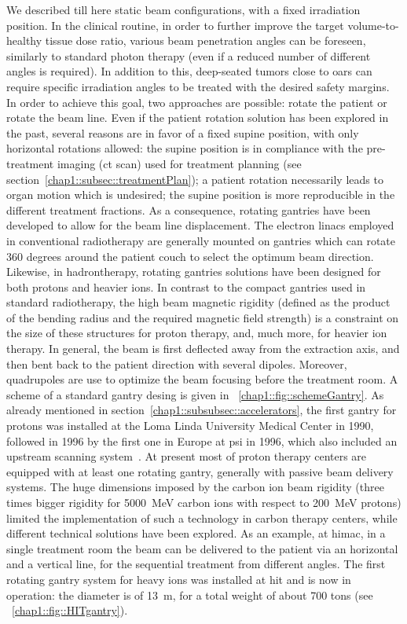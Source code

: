 We described till here static beam configurations,  with a fixed irradiation position. In the clinical routine, in order to further improve the target volume-to-healthy tissue dose ratio, various beam penetration angles can be foreseen, similarly to standard photon therapy (even if a reduced number of different angles is required). In addition to this, deep-seated tumors close to \glspl{oar} can require specific irradiation angles to be treated with the desired safety margins. In order to achieve this goal, two approaches are possible: rotate the patient or rotate the beam line. 
Even if the patient rotation solution has been explored in the past, several reasons are in favor of a fixed supine position, with only horizontal rotations allowed: the supine position is in compliance with the pre-treatment imaging (\gls{ct} scan) used for treatment planning (see section~\ref{chap1::subsec::treatmentPlan}); a patient rotation necessarily leads to organ motion which is undesired; the supine position is more reproducible in the different treatment fractions. As a consequence, rotating gantries have been developed to allow for the beam line displacement.    
The electron linacs employed in conventional radiotherapy are generally mounted on gantries which can rotate 360 degrees around the patient couch to select the optimum beam direction. 
Likewise, in hadrontherapy, rotating gantries solutions have been designed for both protons and heavier ions. In contrast to the compact gantries used in standard radiotherapy, the high beam magnetic rigidity (defined as the product of the bending radius and the required magnetic field strength) is a constraint on the size of these structures for proton therapy, and, much more, for heavier ion therapy. In general, the beam is first deflected away from the extraction axis, and then bent back to the patient direction with several dipoles. Moreover, quadrupoles are use to optimize the beam focusing before the treatment room. A scheme of a standard gantry desing is given in \figurename~\ref{chap1::fig::schemeGantry}. As already mentioned in section~\ref{chap1::subsubsec::accelerators}, the first gantry for protons was installed at the Loma Linda University Medical Center in 1990, followed in 1996 by the first one in Europe at \gls{psi} in 1996, which also included an upstream scanning system~\parencite{Pedroni1995}. At present most of proton therapy centers are equipped with at least one rotating gantry, generally with passive beam delivery systems.
The huge dimensions imposed by the carbon ion beam rigidity (three times bigger rigidity for 5000~MeV carbon ions with respect to 200~MeV protons) limited the implementation of such a technology in carbon therapy centers, while different technical solutions have been explored. As an example, at \gls{himac}, in a single treatment room the beam can be delivered to the patient via an horizontal and a vertical line, for the sequential treatment from different angles. The first rotating gantry system for heavy ions was installed at \gls{hit} and is now in operation: the diameter is of 13~m, for a total weight of about 700 tons (see \figurename~\ref{chap1::fig::HITgantry}).

